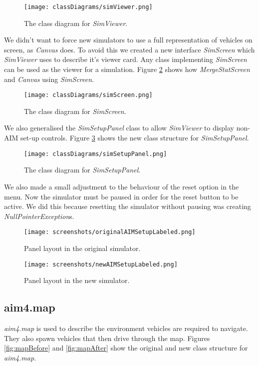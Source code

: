 \begin{appendices}
\begin{figure}[htb]
\centering
\texttt{[image: classDiagrams/simViewer.png]}
\caption{The class diagram for \emph{SimViewer}.}
\label{fig:simViewer}
\end{figure}

We didn't want to force new simulators to use a full representation of vehicles on screen, as \emph{Canvas} does. To avoid this we created a new interface \emph{SimScreen} which \emph{SimViewer} uses to describe it's viewer card. Any class implementing \emph{SimScreen} can be used as the viewer for a simulation. Figure \ref{fig:simScreen} shows how \emph{MergeStatScreen} and \emph{Canvas} using \emph{SimScreen}.

\begin{figure}[htb]
\centering
\texttt{[image: classDiagrams/simScreen.png]}
\caption{The class diagram for \emph{SimScreen}.}
\label{fig:simScreen}
\end{figure}

We also generalised the \emph{SimSetupPanel} class to allow \emph{SimViewer} to display non-AIM set-up controls. Figure \ref{fig:simSetupPanel} shows the new class structure for \emph{SimSetupPanel}.

\begin{figure}[htb]
\centering
\texttt{[image: classDiagrams/simSetupPanel.png]}
\caption{The class diagram for \emph{SimSetupPanel}.}
\label{fig:simSetupPanel}
\end{figure}

We also made a small adjustment to the behaviour of the reset option in the menu. Now the simulator must be paused in order for the reset button to be active. We did this because resetting the simulator without pausing was creating \emph{NullPointerException}s.

\begin{figure}[p]
\centerline{
\texttt{[image: screenshots/originalAIMSetupLabeled.png]}
}
\caption{Panel layout in the original simulator.}
\label{fig:originalAIMSetupLabeled}
\end{figure}

\begin{figure}[p]
\centerline{
\texttt{[image: screenshots/newAIMSetupLabeled.png]}
}
\caption{Panel layout in the new simulator.}
\label{fig:newAIMSetupLabeled}
\end{figure}

\FloatBarrier
\subsection{aim4.map}
\label{subsec:aim4.map}
\emph{aim4.map} is used to describe the environment vehicles are required to navigate. They also spawn vehicles that then drive through the map. Figures \ref{fig:mapBefore} and \ref{fig:mapAfter} show the original and new class structure for \emph{aim4.map}.


\end{appendices}
